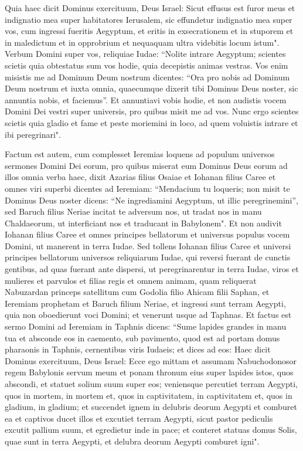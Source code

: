 \begin{biblechapter}
\verse Quia haec dicit Dominus exercituum, Deus Israel: Sicut effusus est furor meus et indignatio mea super habitatores Ierusalem, sic effundetur indignatio mea super vos, cum ingressi fueritis Aegyptum, et eritis in exsecrationem et in stuporem et in maledictum et in opprobrium et nequaquam ultra videbitis locum istum". 
\verse Verbum Domini super vos, reliquiae Iudae: “Nolite intrare Aegyptum; scientes scietis quia obtestatus sum vos hodie, 
\verse quia decepistis animas vestras. Vos enim misistis me ad Dominum Deum nostrum dicentes: “Ora pro nobis ad Dominum Deum nostrum et iuxta omnia, quaecumque dixerit tibi Dominus Deus noster, sic annuntia nobis, et faciemus”. 
\verse Et annuntiavi vobis hodie, et non audistis vocem Domini Dei vestri super universis, pro quibus misit me ad vos. 
\verse Nunc ergo scientes scietis quia gladio et fame et peste moriemini in loco, ad quem voluistis intrare et ibi peregrinari". 
\end{biblechapter}

\begin{biblechapter}  
\verse Factum est autem, cum complesset Ieremias loquens ad populum universos sermones Domini Dei eorum, pro quibus miserat eum Dominus Deus eorum ad illos omnia verba haec, 
\verse dixit Azarias filius Osaiae et Iohanan filius Caree et omnes viri superbi dicentes ad Ieremiam: “Mendacium tu loqueris; non misit te Dominus Deus noster dicens: “Ne ingrediamini Aegyptum, ut illic peregrinemini”, 
\verse sed Baruch filius Neriae incitat te adversum nos, ut tradat nos in manu Chaldaeorum, ut interficiant nos et traducant in Babylonem". 
\verse Et non audivit Iohanan filius Caree et omnes principes bellatorum et universus populus vocem Domini, ut manerent in terra Iudae. 
\verse Sed tollens Iohanan filius Caree et universi principes bellatorum universos reliquiarum Iudae, qui reversi fuerant de cunctis gentibus, ad quas fuerant ante dispersi, ut peregrinarentur in terra Iudae, 
\verse viros et mulieres et parvulos et filias regis et omnem animam, quam reliquerat Nabuzardan princeps satellitum cum Godolia filio Ahicam filii Saphan, et Ieremiam prophetam et Baruch filium Neriae, 
\verse et ingressi sunt terram Aegypti, quia non oboedierunt voci Domini; et venerunt usque ad Taphnas. 
\verse Et factus est sermo Domini ad Ieremiam in Taphnis dicens: 
\verse “Sume lapides grandes in manu tua et absconde eos in caemento, sub pavimento, quod est ad portam domus pharaonis in Taphnis, cernentibus viris Iudaeis; 
\verse et dices ad eos: Haec dicit Dominus exercituum, Deus Israel: Ecce ego mittam et assumam Nabuchodonosor regem Babylonis servum meum et ponam thronum eius super lapides istos, quos abscondi, et statuet solium suum super eos; 
\verse veniensque percutiet terram Aegypti, quos in mortem, in mortem et, quos in captivitatem, in captivitatem et, quos in gladium, in gladium; 
\verse et succendet ignem in delubris deorum Aegypti et comburet ea et captivos ducet illos et excutiet terram Aegypti, sicut pastor pediculis excutit pallium suum, et egredietur inde in pace; 
\verse et conteret statuas domus Solis, quae sunt in terra Aegypti, et delubra deorum Aegypti comburet igni". 
\end{biblechapter}

